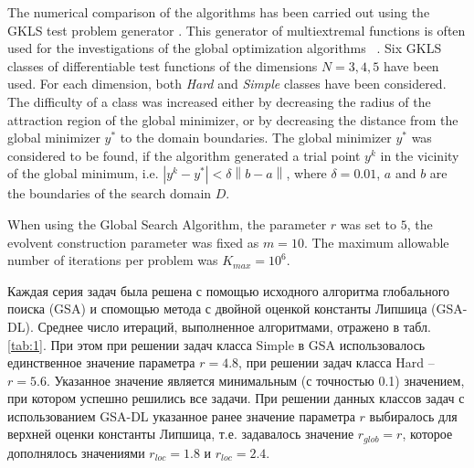 \documentclass[runningheads]{llncs}
\begin{document}
The numerical comparison of the algorithms has been carried out using the GKLS 
test problem generator \cite{Gaviano2003}. 
This generator of multiextremal functions is often used for the investigations of the global 
optimization algorithms ~\cite{Paulavicius2014,Sergeyev2015,%
Barkalov2018}.
Six GKLS classes of differentiable test functions of the dimensions $N = 3,4,5$
have been used. For each dimension, both \textit{Hard} and \textit{Simple}
classes have been considered. The difficulty of a class was increased either by
decreasing the radius of the attraction region of the global minimizer, or by
decreasing the distance from the global minimizer $y^\ast$ to the domain
boundaries. The global minimizer $y^\ast$ was considered to be found, if the
algorithm generated a trial point $y^k$ in the vicinity of the global minimum,
i.e. $\left|y^k-y^\ast\right| <\delta\left\|b-a\right\|$, where $\delta = 0.01$,
$a$ and $b$ are the boundaries of the search domain $D$. 

When using the Global Search Algorithm, the parameter $r$ was set to $5$, 
the evolvent construction parameter was fixed as $m = 10$. 
The maximum allowable number of iterations per problem was $K_{max} = 10^6$.

Каждая серия задач была решена с помощью исходного алгоритма глобального поиска (GSA) и спомощью метода с двойной оценкой константы Липшица (GSA-DL). Среднее число итераций, выполненное алгоритмами, отражено в табл. \ref{tab:1}.
При этом при решении задач класса Simple в GSA использовалось единственное значение параметра $r=4.8$, при решении задач класса Hard -- $r=5.6$.
Указанное значение является минимальным (с точностью 0.1) значением, при котором успешно решились все задачи.
При решении данных классов задач с использованием GSA-DL указанное ранее значение параметра $r$ выбиралось для верхней оценки константы Липшица, т.е. задавалось значение $r_{glob} = r$, которое дополнялось значениями $r_{loc}=1.8$ и $r_{loc}=2.4$. 
\end{document}
